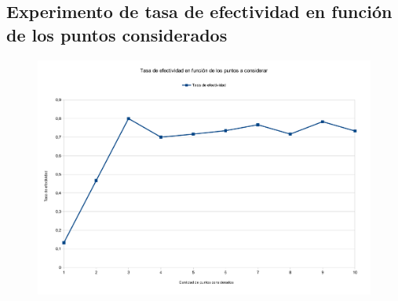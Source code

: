 \subsection{Experimento de tasa de efectividad en función de los puntos considerados}
\begin{figure}[H]{}
\centering
\includegraphics[scale=0.5]{graphs/TEvsMediciones.pdf}
\label{TEvsPac}
\end{figure}
